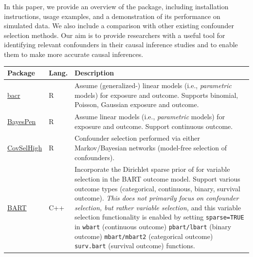 In this paper, we provide an overview of the package, including installation instructions, usage examples, and a demonstration of its performance on simulated data. We also include a comparison with other existing confounder selection methods. Our aim is to provide researchers with a useful tool for identifying relevant confounders in their causal inference studies and to enable them to make more accurate causal inferences.


\begin{table}[t!]
\centering
\begin{tabular}{p{4.9cm}lp{7.9cm}}
\hline
Package           & Lang.   & Description \\ \hline
\href{https://CRAN.R-project.org/package=bacr}{bacr} \citep{wang2015accounting}                  & R       & Assume (generalized-) linear models (i.e., \emph{parametric} models) for exposure and outcome. Supports binomial, Poisson, Gaussian exposure and outcome.  \\
\hline
\href{https://cran.r-project.org/package=BayesPen}{BayesPen}  \citep{bayespen}                            & R  & Assume linear models (i.e., \emph{parametric} models) for exposure and outcome. Support continuous outcome. \\
\hline
\href{https://cran.r-project.org/package=CovSelHigh}{CovSelHigh} \citep{covselhigh}                         & R       & Confounder selection performed via either Markov/Bayesian networks (model-free selection of confounders). \\
                                           \hline
 \href{https://cran.r-project.org/package=BART}{BART}   \citep{BART}                      & C++       & Incorporate the Dirichlet sparse prior of \cite{linero2018bayesian} for variable selection in the BART outcome model. Support various outcome types (categorical, continuous, binary, survival outcome). \emph{This does not primarily focus on confounder selection, but rather variable selection,} and this variable selection functionality is enabled by setting \verb|sparse=TRUE| in \verb|wbart| (continuous outcome) \verb|pbart/lbart| (binary outcome) \verb|mbart/mbart2| (categorical outcome) \verb|surv.bart| (survival outcome) functions.
                                           \\ \hline


\end{tabular}
\end{table}
